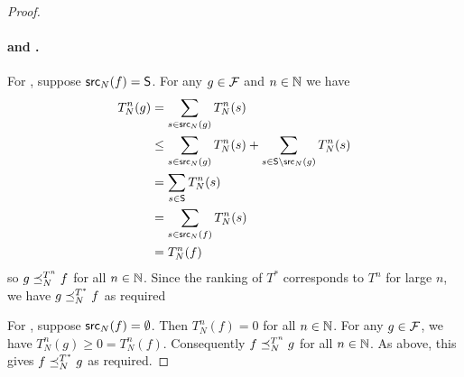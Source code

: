 \begin{proof}
\paragraph{\unanimity{} and \groundedness{}.}
For \unanimity{}, suppose $\mathsf{src}_N(f) = \mathsf{S}$. For any $g \in \mathcal{F}$ and $n \in \mathbb{N}$ we
have
\begin{align*}
    T_N^n(g)
    &= \sum_{s \in \mathsf{src}_N(g)}{T_N^n(s)} \\
    &\le \sum_{s \in \mathsf{src}_N(g)}{T_N^n(s)} + \sum_{s \in \mathsf{S} \setminus \mathsf{src}_N(g)}{T_N^n(s)} \\
    &= \sum_{s \in \mathsf{S}}{T_N^n(s)} \\
    &= \sum_{s \in \mathsf{src}_N(f)}{T_N^n(s)} \\
    &= T_N^n(f)
\end{align*}
so $g \preceq_N^{T^n} f$ for all $n \in \mathbb{N}$. Since the ranking of $T^*$
corresponds to $T^n$ for large $n$, we have $g \preceq_N^{T^*} f$ as
required

For \groundedness{}, suppose $\mathsf{src}_N(f) = \emptyset$. Then $T_N^n(f) = 0$ for all $n
\in \mathbb{N}$. For any $g \in \mathcal{F}$, we have $T_N^n(g) \ge 0 = T_N^n(f)$.
Consequently $f \preceq_N^{T^n} g$ for all $n \in \mathbb{N}$. As above, this gives $f
\preceq_N^{T^*} g$ as required.
\end{proof}
